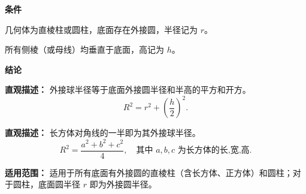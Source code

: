 \begin{statementbox}
	\textbf{\textcolor{CStatement}{条件}}
	\begin{description}[style=nextline, leftmargin=2.8em, labelsep=0.5em, itemsep=0.35em]
		\item[\textbf{\textcolor{CStatement}{条件1（底面外接圆）：}}] 几何体为直棱柱或圆柱，底面存在外接圆，半径记为 $r$。
		\item[\textbf{\textcolor{CStatement}{条件2（侧棱垂直底面）：}}] 所有侧棱（或母线）均垂直于底面，高记为 $h$。
	\end{description}

	\textbf{\textcolor{CStatement}{结论}}
	\begin{description}[style=nextline, leftmargin=2.8em, labelsep=0.5em, itemsep=0.45em]
		\item[\textbf{\textcolor{CStatement}{结论一（外接球半径公式）：}}]
			\textbf{\textcolor{CStatement}{直观描述：}}
			外接球半径等于底面外接圆半径和半高的平方和开方。
			\[
				R^2 = r^2 + \left(\frac{h}{2}\right)^2.
			\]

		\item[\textbf{\textcolor{CStatement}{推广结论（长方体特例）：}}]
			\textbf{\textcolor{CStatement}{直观描述：}}
			长方体对角线的一半即为其外接球半径。
			\[
				R^2 = \frac{a^2+b^2+c^2}{4}, \quad \text{其中 } a,b,c \text{ 为长方体的长,宽,高}.
			\]
	\end{description}

	\textbf{\textcolor{CStatement}{适用范围：}}
	适用于所有底面有外接圆的直棱柱（含长方体、正方体）和圆柱；对于圆柱，底面圆半径 $r$ 即为外接圆半径。
\end{statementbox}
